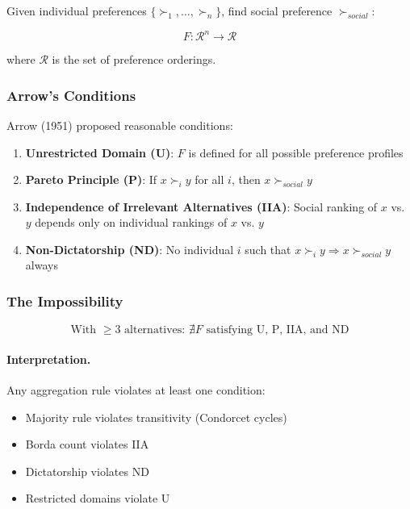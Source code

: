Given individual preferences $\{\succ_1, \ldots, \succ_n\}$, find social 
preference $\succ_{social}$:

\begin{equation}
F: \mathcal{R}^n \to \mathcal{R}
\end{equation}

where $\mathcal{R}$ is the set of preference orderings.

\subsubsection{Arrow's Conditions}

Arrow (1951) proposed reasonable conditions:

\begin{enumerate}
    \item \textbf{Unrestricted Domain (U)}: $F$ is defined for all possible preference profiles
    \item \textbf{Pareto Principle (P)}: If $x \succ_i y$ for all $i$, then $x \succ_{social} y$
    \item \textbf{Independence of Irrelevant Alternatives (IIA)}: Social ranking of $x$ vs. $y$ depends only on individual rankings of $x$ vs. $y$
    \item \textbf{Non-Dictatorship (ND)}: No individual $i$ such that $x \succ_i y \Rightarrow x \succ_{social} y$ always
\end{enumerate}

\subsubsection{The Impossibility}

\begin{equation}
\boxed{
\text{With } \geq 3 \text{ alternatives: } \nexists F \text{ satisfying U, P, IIA, and ND}
}
\label{eq:arrow}
\end{equation}

\paragraph{Interpretation.}
Any aggregation rule violates at least one condition:
\begin{itemize}
    \item Majority rule violates transitivity (Condorcet cycles)
    \item Borda count violates IIA
    \item Dictatorship violates ND
    \item Restricted domains violate U
\end{itemize}

